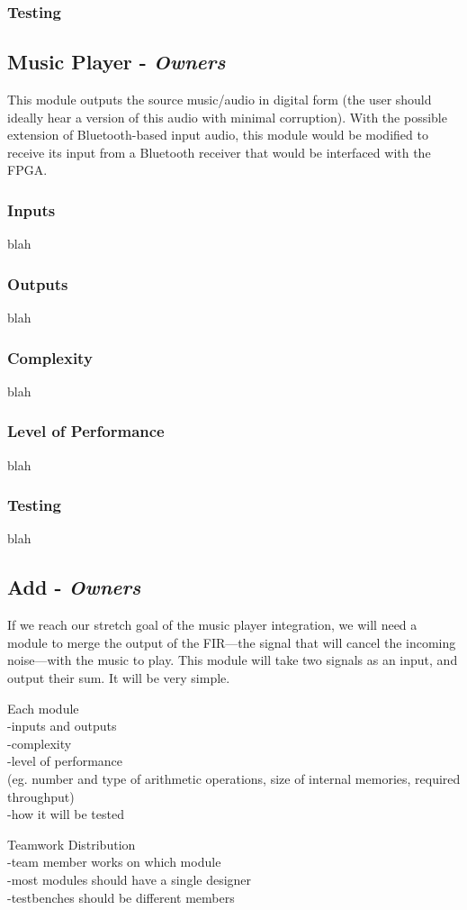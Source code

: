 \documentclass[12pt]{article}
\begin{document}
\begin{multicols}{2}
\subsubsection{Testing}

\subsection{Music Player - \textit{Owners}}
This module outputs the source music/audio in digital form (the user should ideally hear a version of this audio with minimal corruption). With the possible extension of Bluetooth-based input audio, this module would be modified to receive its input from a Bluetooth receiver that would be interfaced with the FPGA.
\subsubsection{Inputs}
blah
\subsubsection{Outputs}
blah
\subsubsection{Complexity}
blah
\subsubsection{Level of Performance}
blah
\subsubsection{Testing}
blah

\subsection{Add - \textit{Owners}}
If we reach our stretch goal of the music player integration, we will need a module to merge the output of the FIR---the signal that will cancel the incoming noise---with the music to play. This module will take two signals as an input, and output their sum. It will be very simple.

\end{multicols}
Each module
\\-inputs and outputs
\\-complexity
\\-level of performance
\\(eg. number and type of arithmetic operations, size of internal memories, required throughput)
\\-how it will be tested

Teamwork Distribution
\\-team member works on which module 
\\-most modules should have a single designer
\\-testbenches should be different members

\printbibliography
\end{document}
